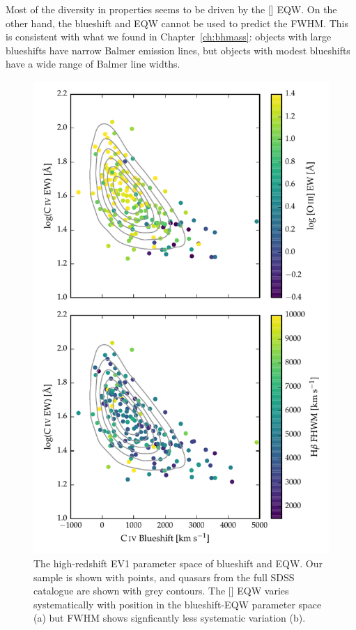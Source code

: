Most of the diversity in  properties seems to be driven by the [] \ac{EQW}. 
On the other hand, the  blueshift and \ac{EQW} cannot be used to predict the \hb FWHM. 
This is consistent with what we found in Chapter~\ref{ch:bhmass}: objects with large  blueshifts have narrow Balmer emission lines, but objects with modest  blueshifts have a wide range of Balmer line widths. 

\begin{figure}
    \includegraphics[width=\columnwidth]{figures/chapter04/ev1.pdf} 
    \caption{The high-redshift \ac{EV1} parameter space of  blueshift and \ac{EQW}. Our sample is shown with points, and quasars from the full \ac{SDSS} catalogue are shown with grey contours. The [] EQW varies systematically with position in the  blueshift-\ac{EQW} parameter space (a) but \hb FWHM shows signficantly less systematic variation (b).}      
    \label{fig:ev1}
\end{figure}

